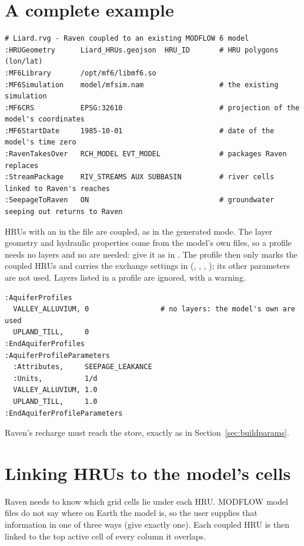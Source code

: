 \section{A complete example}
\begin{lstlisting}
# Liard.rvg - Raven coupled to an existing MODFLOW 6 model
:HRUGeometry      Liard_HRUs.geojson  HRU_ID       # HRU polygons (lon/lat)
:MF6Library       /opt/mf6/libmf6.so
:MF6Simulation    model/mfsim.nam                  # the existing simulation
:MF6CRS           EPSG:32610                       # projection of the model's coordinates
:MF6StartDate     1985-10-01                       # date of the model's time zero
:RavenTakesOver   RCH_MODEL EVT_MODEL              # packages Raven replaces
:StreamPackage    RIV_STREAMS AUX SUBBASIN         # river cells linked to Raven's reaches
:SeepageToRaven   ON                               # groundwater seeping out returns to Raven
\end{lstlisting}
HRUs with an  in the  file are coupled, as in the generated mode. The layer geometry and
hydraulic properties come from the model's own files, so a profile needs no layers and no  are
needed: give it as  in . The profile then only marks the coupled HRUs and carries the
exchange settings in  (, ,
, ); its other parameters are not used. Layers listed in a profile are ignored, with a warning.
\begin{lstlisting}
:AquiferProfiles
  VALLEY_ALLUVIUM, 0                 # no layers: the model's own are used
  UPLAND_TILL,     0
:EndAquiferProfiles
:AquiferProfileParameters
  :Attributes,     SEEPAGE_LEAKANCE
  :Units,          1/d
  VALLEY_ALLUVIUM, 1.0
  UPLAND_TILL,     1.0
:EndAquiferProfileParameters
\end{lstlisting}
Raven's recharge must reach the  store, exactly as in Section~\ref{sec:buildparams}.

\section{Linking HRUs to the model's cells}
Raven needs to know which grid cells lie under each HRU. MODFLOW model files do not say where on Earth the model is, so the
user supplies that information in one of three ways (give exactly one). Each coupled HRU is then linked to the top active
cell of every column it overlaps.

